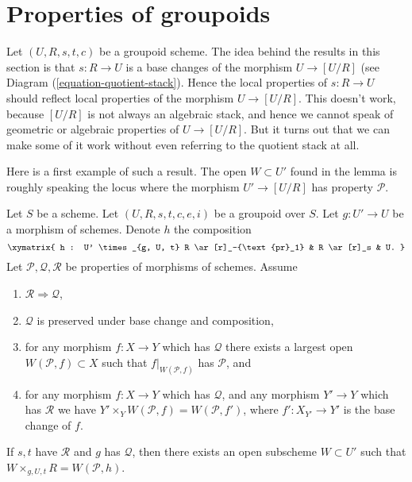 \section{Properties of groupoids}
\label{section-technical-lemma}

\noindent
Let $(U, R, s, t, c)$ be a groupoid scheme.
The idea behind the results in this section is that $s: R \to U$
is a base changes of the morphism $U \to [U/R]$ (see
Diagram (\ref{equation-quotient-stack}).
Hence the local properties of $s : R \to U$ should reflect local
properties of the morphism $U \to [U/R]$.
This doesn't work, because $[U/R]$ is not always an algebraic stack, and
hence we cannot speak of geometric or algebraic properties of
$U \to [U/R]$.
But it turns out that we can make some of it work without even
referring to the quotient stack at all.

\medskip\noindent
Here is a first example of such a result. The open $W \subset U'$ found
in the lemma is roughly speaking the locus where the morphism
$U' \to [U/R]$ has property $\mathcal{P}$.

\begin{lemma}
\label{lemma-local-source}
Let $S$ be a scheme.
Let $(U, R, s, t, c, e, i)$ be a groupoid over $S$.
Let $g : U' \to U$ be a morphism of schemes.
Denote $h$ the composition
$$
\xymatrix{
h : U' \times_{g, U, t} R \ar[r]_-{\text{pr}_1} & R \ar[r]_s & U.
}
$$
Let $\mathcal{P}, \mathcal{Q}, \mathcal{R}$ be properties of morphisms
of schemes. Assume
\begin{enumerate}
\item $\mathcal{R} \Rightarrow \mathcal{Q}$,
\item $\mathcal{Q}$ is preserved under base change and composition,
\item for any morphism $f : X \to Y$ which has $\mathcal{Q}$ there exists a
largest open $W(\mathcal{P}, f) \subset X$ such that $f|_{W(\mathcal{P}, f)}$
has $\mathcal{P}$, and
\item for any morphism $f : X \to Y$ which has $\mathcal{Q}$,
and any morphism $Y' \to Y$ which has $\mathcal{R}$ we have
$Y' \times_Y W(\mathcal{P}, f) = W(\mathcal{P}, f')$, where
$f' : X_{Y'} \to Y'$ is the base change of $f$.
\end{enumerate}
If $s, t$ have $\mathcal{R}$ and $g$ has $\mathcal{Q}$, then
there exists an open subscheme $W \subset U'$ such that
$W \times_{g, U, t} R = W(\mathcal{P}, h)$.
\end{lemma}

